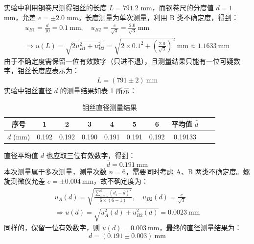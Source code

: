 \documentclass[UTF8]{article}
\theoremstyle{MyLineTheoremStyle} %
\theoremstyle{MyBlockTheoremStyle} %
\theoremstyle{MySubsubsectionStyle} %
\begin{document}
实验中利用钢卷尺测得钼丝的长度 $L = 791.2$ mm，而钢卷尺的分度值 $d = 1$ mm，允差 $e = \pm 2.0$ mm。长度测量为单次测量，利用 B 类不确定度，得到：
\begin{gather}
u_{B1} = \frac{d}{10} = 0.1 \ \mathrm{mm} ,\quad 
u_{B2} = \frac{e}{\sqrt{3}} = \frac{2.0}{\sqrt{3}} \ \mathrm{mm} \\
\Longrightarrow 
u(L) = \sqrt{2u_{B1}^2 + u_{B2}^2} = \sqrt{2\times 0.1^2 + \left(\frac{2.0}{\sqrt{3}}\right)^2} \ \mathrm{mm} \approx 1.1633 \ \mathrm{mm}
\end{gather}
由于不确定度需保留一位有效数字（只进不退），且测量结果只能有一位可疑数字，钼丝长度应表示为：
\begin{gather}
L = (791 \pm 2) \ \mathrm{mm}
\end{gather}
实验中钼丝直径 $d$ 的测量结果如表 \ref{钼丝直径测量结果} 所示：
\begin{table}[H]\centering
    \caption{钼丝直径测量结果}
    \label{钼丝直径测量结果}
\begin{tabular}{cccccccccc}\toprule
    序号 & 1 & 2 & 3 & 4 & 5 & 6 & 平均值 $\bar{d}$  \\
    \midrule
    $d$ (mm)  & 0.192 & 0.192 &	0.190 &	0.191 &	0.191 &	0.192 & 0.19133  \\
    \bottomrule
\end{tabular}
\end{table}
直径平均值 $\bar{d}$ 也应取三位有效数字，得到：
\begin{equation}
\bar{d} = 0.191 \ \mathrm{mm}
\end{equation}
本次测量属于多次测量，测量次数 $n = 6$，需要同时考虑 A、B 两类不确定度。螺旋测微仪允差 $e = \pm 0.004 \ \mathrm{mm}$，故不确定度为：
\begin{gather}
u_A(d) = \sqrt{\frac{\sum_{i=1}^{6}\left(d_i - \bar{d}\right)^2}{6\times (6 - 1)}} ,\quad u_{B2}(d) = \frac{e}{\sqrt{3}} \\ 
\Longrightarrow 
u(d) = \sqrt{u_A^2(d) + u_{B2}^2(d)} = 0.0023 \ \mathrm{mm}
\end{gather}
同样的，保留一位有效数字，则 $u(d) = 0.003 \ \mathrm{mm}$，最终的直径测量结果为：
\begin{equation}
d = (0.191 \pm 0.003) \ \mathrm{mm}
\end{equation}
\end{document}
